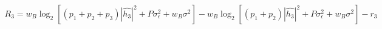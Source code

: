 \documentclass[preview]{standalone}
\begin{document}
\begin{align*}
R_3 = w_B \log_2 \left[(p_1 + p_2 + p_3) \left|\hat{h_3}\right|^2 + P \sigma_{\epsilon}^2 + w_B \sigma^2\right] - w_B \log_2 \left[(p_1 + p_2) \left|\hat{h_3}\right|^2 + P \sigma_{\epsilon}^2 + w_B \sigma^2\right] - r_3
\end{align*}
\end{document}
